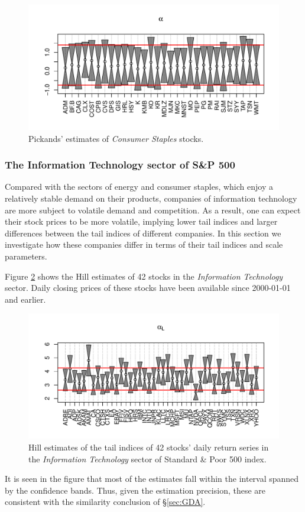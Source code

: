 \documentclass{article}
\begin{document}
\begin{figure}[htb!]
  \includegraphics[width=\textwidth]{Consumer_Staples_Pickands.pdf}
  \caption{Pickands' estimates of {\it Consumer Staples} stocks.}
  \label{fig:Consumer_Staples_Pickands}
\end{figure}

\subsubsection{The Information Technology sector of S\&P 500}
Compared with the sectors of energy and consumer staples, which enjoy
a relatively stable demand on their products, companies of information
technology are more subject to volatile demand and competition. As a
result, one can expect their stock prices to be more volatile, implying
lower tail indices and larger differences between the tail indices of
different companies. In this section we investigate how these companies
differ in terms of their tail indices and scale parameters.

Figure \ref{fig:Information_Technology_Hill} shows the Hill
estimates of 42 stocks in the {\it Information Technology} sector. Daily
closing prices of these stocks have been available since 2000-01-01 and
earlier.
\begin{figure}[htb!]
  \centering
  \includegraphics[width=\textwidth]{Information_Technology_Hill.pdf}
  \caption{Hill estimates of the tail indices of 42 stocks' daily
    return series in the {\it Information Technology} sector of Standard
    \& Poor 500 index.
  }
  \label{fig:Information_Technology_Hill}
\end{figure}
It is seen in the figure that most of the estimates fall within the
interval spanned by the confidence bands. Thus, given the estimation
precision, these are consistent with the similarity conclusion of 
\S\ref{sec:GDA}.
\end{document}
